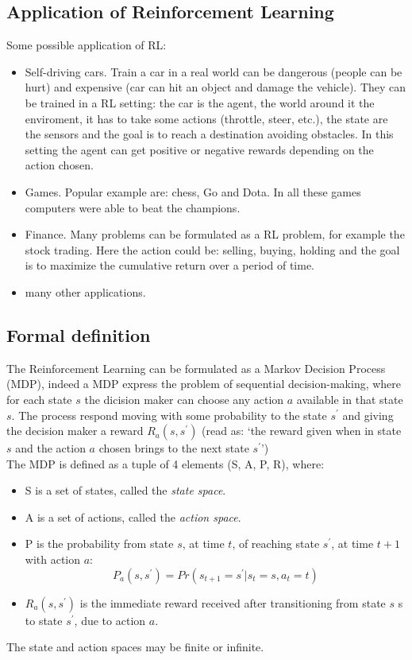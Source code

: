 \documentclass[14pt]{extarticle}
\def\sp{\vspace{5pt}}
\begin{document}
\begin{flushleft}
\subsection{Application of Reinforcement Learning}
Some possible application of RL:
\begin{itemize}
\item Self-driving cars. Train a car in a real world can be dangerous (people can be hurt) and expensive (car can hit an object and damage the vehicle). They can be trained in a RL setting: the car is the agent, the world around it the enviroment, it has to take some actions (throttle, steer, etc.), the state are the sensors and the goal is to reach a destination avoiding obstacles. In this setting the agent can get positive or negative rewards depending on the action chosen.
\item Games. Popular example are: chess, Go and Dota. In all these games computers were able to beat the champions.
\item Finance. Many problems can be formulated as a RL problem, for example the stock trading. Here the action could be: selling, buying, holding and the goal is to maximize the  cumulative return over a period of time.
\item many other applications\cite{RLapplications}.
\end{itemize}

\subsection{Formal definition}
\sp
The Reinforcement Learning can be formulated as a Markov Decision Process (MDP), indeed a MDP express the problem of sequential decision-making, where for each state $s$ the dicision maker can choose any action $a$ available in that state $s$. The process respond moving with some probability to the state $s^\prime$ and giving the decision maker a reward $R_a(s,s^\prime)$ (read as: `the reward given when in state $s$ and the action $a$ chosen brings to the next state $s^\prime$')
\\
The MDP is defined as a tuple of 4 elements (S, A, P, R), where:
\begin{itemize}
\item S is a set of states, called the \emph{state space}.
\item A is a set of actions, called the \emph{action space}.
\item P is the probability from state $s$, at time $t$, of reaching state $s^\prime$, at time $t+1$ with action $a$:
\[P_a(s,s^\prime) = Pr(s_{t+1} = s^\prime | s_t = s, a_t = t)\]
\item $R_a(s,s^\prime)$ is the immediate reward received after transitioning from state $s$ s to state $s^\prime$, due to action $a$.
\end{itemize}
The state and action spaces may be finite or infinite.


\end{flushleft}
\end{document}
